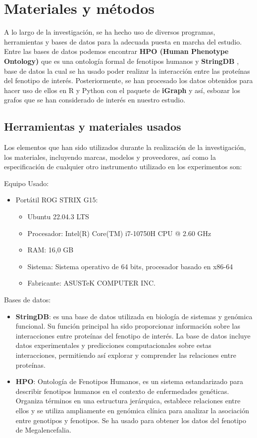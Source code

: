 \section{Materiales y métodos}

A lo largo de la investigación, se ha hecho uso de diversos programas, herramientas y bases de datos para la adecuada puesta en marcha del estudio. Entre las bases de datos podemos encontrar \textbf{HPO (Human Phenotype Ontology)} \cite{hpo} que es una ontología formal de fenotipos humanos  y \textbf{StringDB} \cite{stringdb}, base de datos la cual se ha usado poder realizar la interacción entre las proteínas del fenotipo de interés. Posteriormente, se han procesado los datos obtenidos para hacer uso de ellos en R y Python con el paquete de \textbf{iGraph} \cite{igraph} y así, esbozar los grafos que se han considerado de interés en nuestro estudio.

\subsection{Herramientas y materiales usados}

Los elementos que han sido utilizados durante la realización de la investigación, los materiales, incluyendo marcas, modelos y proveedores, así como la especificación de cualquier otro instrumento utilizado en los experimentos son:

Equipo Usado:
    \begin{itemize}
        \item Portátil ROG STRIX G15:
        \begin{itemize}
            \item Ubuntu 22.04.3 LTS
            \item Procesador: Intel(R) Core(TM) i7-10750H CPU @ 2.60 GHz
            \item RAM: 16,0 GB
            \item Sistema: Sistema operativo de 64 bits, procesador basado en x86-64
            \item Fabricante: ASUSTeK COMPUTER INC.
        \end{itemize}
    \end{itemize}

Bases de datos:
\begin{itemize}
        \item \textbf{StringDB}: es una base de datos utilizada en biología de sistemas y genómica funcional. Su función principal ha sido proporcionar información sobre las interacciones entre proteínas del fenotipo de interés. La base de datos incluye datos experimentales y predicciones computacionales sobre estas interacciones, permitiendo así explorar y comprender las relaciones entre proteínas.
        \item \textbf{HPO}: Ontología de Fenotipos Humanos, es un sistema estandarizado para describir fenotipos humanos en el contexto de enfermedades genéticas. Organiza términos en una estructura jerárquica, establece relaciones entre ellos y se utiliza ampliamente en genómica clínica para analizar la asociación entre genotipos y fenotipos. Se ha usado para obtener los datos del fenotipo de Megalencefalia.
\end{itemize}



